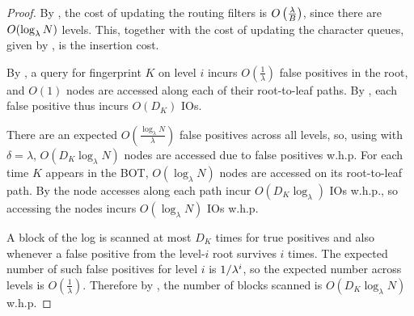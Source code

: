 \begin{proof}
	By , the cost of updating the routing
	filters is $O\left(\frac{\lambda}{B}\right)$, since there are $O(\log_\lambda
	N)$ levels. This, together with the cost of updating the character queues,
	given by , is the insertion cost.

	By , a query for fingerprint $K$ on level
	$i$ incurs $O\left(\frac{1}{\lambda}\right)$ false positives in the root,
	and $O(1)$ nodes are accessed along each of their root-to-leaf paths. By
	, each false positive thus incurs $O(D_K)$
	IOs.

	There are an expected $O\left(\frac{\log_\lambda N}{\lambda}\right)$ false
	positives across all levels, so, using  with
	$\delta=\lambda$, $O(D_K\log_\lambda N)$ nodes are accessed due to false
	positives w.h.p. For each time $K$ appears in the BOT, $O(\log_\lambda N)$
	nodes are accessed on its root-to-leaf path. By
	 the node accesses along each path incur
	$O(D_K\log_\lambda)$ IOs w.h.p., so accessing the nodes incurs
	$O(\log_\lambda N)$ IOs w.h.p.

	A block of the log is scanned at most $D_K$ times for true positives and
	also whenever a false positive from the level-$i$ root survives $i$ times.
	The expected number of such false positives for level $i$ is $1/\lambda^i$,
	so the expected number across levels is $O\left(\frac{1}{\lambda}\right)$.
	Therefore by , the number of blocks scanned is
	$O(D_K\log_\lambda N)$ w.h.p.
\end{proof}

